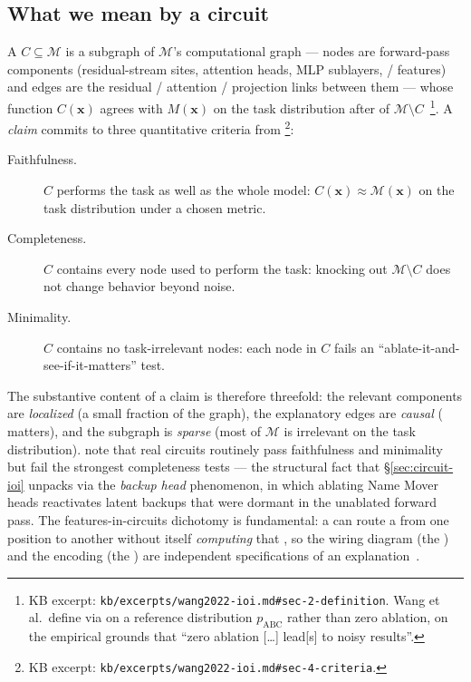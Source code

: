 \subsection{What we mean by a circuit}
\label{sec:substrate-circuit}

A \textbf{} $C \subseteq \mathcal{M}$ is a subgraph of
$\mathcal{M}$'s computational graph --- nodes are forward-pass
components (residual-stream sites, attention heads, MLP sublayers,
/ features) and edges are the residual / attention /
projection links between them --- whose function $C(\mathbf{x})$
agrees with $M(\mathbf{x})$ on the task distribution after \emph{}
of $\mathcal{M} \setminus C$~\citep[\S 2]{wang2022-ioi}\footnote{KB
excerpt: \texttt{kb/excerpts/wang2022-ioi.md\#sec-2-definition}. Wang
et al.\ define  via  on a reference distribution
$p_{\mathrm{ABC}}$ rather than zero ablation, on the empirical
grounds that ``zero ablation [\ldots] lead[s] to noisy results''.}.
A  \emph{claim} commits to three quantitative criteria from
\citet[\S 4]{wang2022-ioi}\footnote{KB excerpt:
\texttt{kb/excerpts/wang2022-ioi.md\#sec-4-criteria}.}:
\begin{description}
  \item[Faithfulness.] $C$ performs the task as well as the whole
    model: $C(\mathbf{x}) \approx \mathcal{M}(\mathbf{x})$ on the task
    distribution under a chosen metric.
  \item[Completeness.] $C$ contains every node used to perform the
    task: knocking out $\mathcal{M} \setminus C$ does not change
    behavior beyond noise.
  \item[Minimality.] $C$ contains no task-irrelevant nodes: each
    node in $C$ fails an ``ablate-it-and-see-if-it-matters'' test.
\end{description}
The substantive content of a  claim is therefore threefold:
the relevant components are \emph{localized} (a small fraction of the
graph), the explanatory edges are \emph{causal} ( matters),
and the subgraph is \emph{sparse} (most of $\mathcal{M}$ is
irrelevant on the task distribution). \citet{wang2022-ioi} note that
real circuits routinely pass faithfulness and minimality but fail the
strongest completeness tests --- the structural fact that
\S\ref{sec:circuit-ioi} unpacks via the \emph{backup head}
phenomenon, in which ablating Name Mover heads reactivates latent
backups that were dormant in the unablated forward pass. The
features-in-circuits dichotomy is fundamental: a  can route a
 from one position to another without itself \emph{computing}
that , so the wiring diagram (the ) and the encoding
(the ) are independent specifications of an
explanation~\citep[\S 2.1]{wang2022-ioi}.

